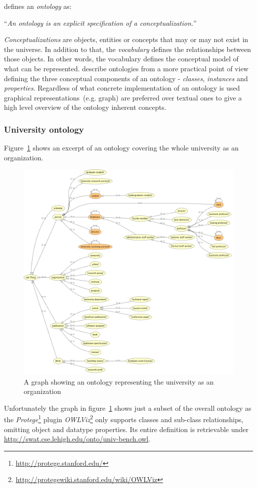 \documentclass{article}
\begin{document}
\citet{jour:gruber} defines an \textit{ontology} as:

``\textit{An ontology is an explicit specification of a conceptualization.}''

\textit{Conceptualizations} are objects, entities or concepts that may or may not exist in the universe. In addition to that, the \textit{vocabulary} defines the relationships between those objects. In other words, the vocabulary defines the conceptual model of what can be represented. 
\citet{jour:owl} describe ontologies from a more practical point of view defining the three conceptual components of an ontology - \textit{classes}, \textit{instances} and \textit{properties}. Regardless of what concrete implementation of an ontology is used graphical representations~(e.g. graph) are preferred over textual ones to give a high level overview of the ontology inherent concepts. 

\subsubsection{University ontology}
Figure~\ref{fig:owl-univ1} shows an excerpt of an ontology covering the whole university as an organization.
\begin{figure}[H]
	\centering \includegraphics*[width=.8\columnwidth]{owl-univ1.png}
	\caption{A graph showing an ontology representing the university as an organization}
	\label{fig:owl-univ1}
\end{figure}
Unfortunately the graph in figure~\ref{fig:owl-univ1} shows just a subset of the overall ontology as the \textit{Protege}\footnote{\url{http://protege.stanford.edu/}} plugin \textit{OWLViz}\footnote{\url{http://protegewiki.stanford.edu/wiki/OWLViz}} only supports classes and sub-class relationships, omitting object and datatype properties. Its entire definition is retrievable under \url{http://swat.cse.lehigh.edu/onto/univ-bench.owl}. 
\end{document}
